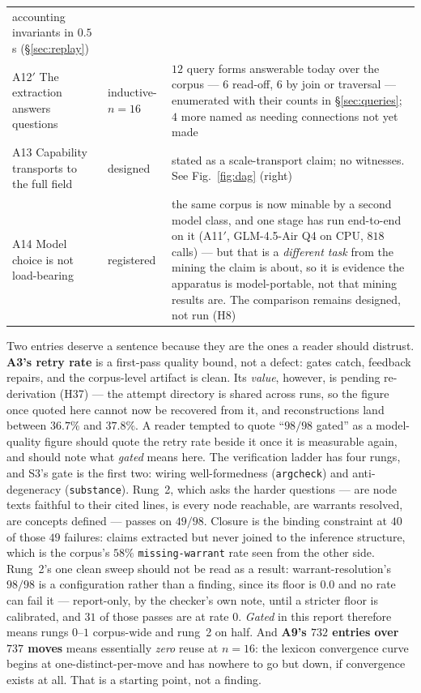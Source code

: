 \documentclass[11pt]{article}
\newcommand{\hz}[1]{\textsf{#1}}
\begin{document}
{\begin{longtable}{p{} p{} p{}}
accounting invariants in $0.5$\,s (\S\ref{sec:replay})\\[3pt]
A12$'$ The extraction answers questions & inductive-$n{=}16$ &
$12$ query forms answerable today over the corpus --- $6$ read-off, $6$ by
join or traversal --- enumerated with their counts in \S\ref{sec:queries};
$4$ more named as needing connections not yet made\\[3pt]
A13 Capability transports to the full field & designed &
stated as a scale-transport claim; no witnesses. See
Fig.~\ref{fig:dag} (right)\\[3pt]
A14 Model choice is not load-bearing & registered &
the same corpus is now minable by a second model class, and one stage has run
end-to-end on it (A11$'$, GLM-4.5-Air Q4 on CPU, $818$ calls) --- but that is a
\emph{different task} from the mining the claim is about, so it is evidence the
apparatus is model-portable, not that mining results are. The comparison remains
designed, not run (\hz{H8})\\
\end{longtable}
}

\medskip
Two entries deserve a sentence because they are the ones a reader should
distrust. \textbf{A3's retry rate} is a first-pass quality bound, not a
defect: gates catch, feedback repairs, and the corpus-level artifact is clean.
Its \emph{value}, however, is pending re-derivation (\hz{H37}) --- the attempt
directory is shared across runs, so the figure once quoted here cannot now be
recovered from it, and reconstructions land between $36.7\%$ and $37.8\%$. A
reader tempted to quote ``$98/98$ gated'' as a model-quality figure should quote
the retry rate beside it once it is measurable again, and should note what \emph{gated} means
here. The verification ladder has four rungs, and S3's gate is the first two:
wiring well-formedness (\texttt{argcheck}) and anti-degeneracy
(\texttt{substance}). Rung~2, which asks the harder questions --- are node texts
faithful to their cited lines, is every node reachable, are warrants resolved,
are concepts defined --- passes on $49/98$. Closure is the binding constraint at
$40$ of those $49$ failures: claims extracted but never joined to the inference
structure, which is the corpus's $58\%$ \texttt{missing-warrant} rate seen from
the other side. Rung~2's one clean sweep should not be read as a result:
warrant-resolution's $98/98$ is a configuration rather than a finding, since its
floor is $0.0$ and no rate can fail it --- report-only, by the checker's own
note, until a stricter floor is calibrated, and $31$ of those passes are at
rate $0$. \emph{Gated} in this report therefore means rungs $0$--$1$
corpus-wide and rung~2 on half. And \textbf{A9's $732$ entries over
$737$ moves} means essentially \emph{zero} reuse at $n{=}16$: the lexicon
convergence curve begins at one-distinct-per-move and has nowhere to go but
down, if convergence exists at all. That is a starting point, not a finding.
\end{document}
